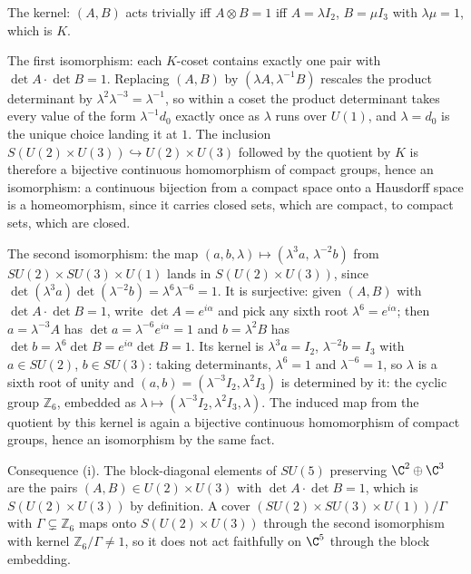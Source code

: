 The kernel: $(A, B)$ acts trivially iff $A \otimes B = 1$ iff $A = \lambda I_{2}$, $B = \mu I_{3}$ with $\lambda\mu = 1$, which is $K$.

The first isomorphism: each $K$-coset contains exactly one pair with $\det A \cdot \det B = 1$. Replacing $(A, B)$ by $(\lambda A, \lambda^{-1}B)$ rescales the product determinant by $\lambda^{2}\lambda^{-3} = \lambda^{-1}$, so within a coset the product determinant takes every value of the form $\lambda^{-1}d_{0}$ exactly once as $\lambda$ runs over $U(1)$, and $\lambda = d_{0}$ is the unique choice landing it at $1$. The inclusion $S(U(2) \times U(3)) \hookrightarrow U(2) \times U(3)$ followed by the quotient by $K$ is therefore a bijective continuous homomorphism of compact groups, hence an isomorphism: a continuous bijection from a compact space onto a Hausdorff space is a homeomorphism, since it carries closed sets, which are compact, to compact sets, which are closed.

The second isomorphism: the map $(a, b, \lambda) \mapsto (\lambda^{3}a,\, \lambda^{-2}b)$ from $SU(2) \times SU(3) \times U(1)$ lands in $S(U(2) \times U(3))$, since $\det(\lambda^{3}a)\det(\lambda^{-2}b) = \lambda^{6}\lambda^{-6} = 1$. It is surjective: given $(A, B)$ with $\det A \cdot \det B = 1$, write $\det A = e^{i\alpha}$ and pick any sixth root $\lambda^{6} = e^{i\alpha}$; then $a = \lambda^{-3}A$ has $\det a = \lambda^{-6}e^{i\alpha} = 1$ and $b = \lambda^{2}B$ has $\det b = \lambda^{6}\det B = e^{i\alpha}\det B = 1$. Its kernel is $\lambda^{3}a = I_{2}$, $\lambda^{-2}b = I_{3}$ with $a \in SU(2)$, $b \in SU(3)$: taking determinants, $\lambda^{6} = 1$ and $\lambda^{-6} = 1$, so $\lambda$ is a sixth root of unity and $(a, b) = (\lambda^{-3}I_{2}, \lambda^{2}I_{3})$ is determined by it: the cyclic group $\mathbb{Z}_{6}$, embedded as $\lambda \mapsto (\lambda^{-3}I_{2}, \lambda^{2}I_{3}, \lambda)$. The induced map from the quotient by this kernel is again a bijective continuous homomorphism of compact groups, hence an isomorphism by the same fact.

Consequence (i). The block-diagonal elements of $SU(5)$ preserving $\C^{2} \oplus \C^{3}$ are the pairs $(A, B) \in U(2) \times U(3)$ with $\det A \cdot \det B = 1$, which is $S(U(2) \times U(3))$ by definition. A cover $(SU(2) \times SU(3) \times U(1))/\Gamma$ with $\Gamma \subsetneq \mathbb{Z}_{6}$ maps onto $S(U(2) \times U(3))$ through the second isomorphism with kernel $\mathbb{Z}_{6}/\Gamma \neq 1$, so it does not act faithfully on $\C^{5}$ through the block embedding.

